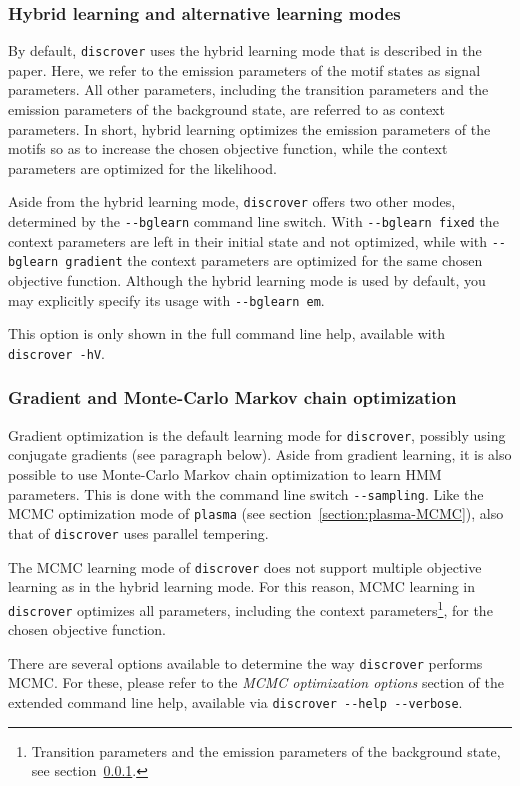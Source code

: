 \documentclass[a4paper]{article}
\newcommand{\plasma}[0]{\texttt{plasma}}
\newcommand{\discrover}[0]{\texttt{discrover}}
\begin{document}
\subsubsection{Hybrid learning and alternative learning modes}
\label{section:hybrid-learning}
By default, \discrover{} uses the hybrid learning mode that is described in the paper.
Here, we refer to the emission parameters of the motif states as signal parameters.
All other parameters, including the transition parameters and the emission parameters of the background state, are referred to as context parameters.
In short, hybrid learning optimizes the emission parameters of the motifs so as to increase the chosen objective function, while the context parameters are optimized for the likelihood.

Aside from the hybrid learning mode, \discrover{} offers two other modes, determined by the \verb|--bglearn| command line switch.
With \verb|--bglearn fixed| the context parameters are left in their initial state and not optimized, while with \verb|--bglearn gradient| the context parameters are optimized for the same chosen objective function.
Although the hybrid learning mode is used by default, you may explicitly specify its usage with \verb|--bglearn em|.

This option is only shown in the full command line help, available with \verb|discrover -hV|.

\subsubsection{Gradient and Monte-Carlo Markov chain optimization}
Gradient optimization is the default learning mode for \discrover{}, possibly using conjugate gradients (see paragraph below).
Aside from gradient learning, it is also possible to use Monte-Carlo Markov chain optimization to learn HMM parameters.
This is done with the command line switch \verb|--sampling|.
Like the MCMC optimization mode of \plasma{} (see section~\ref{section:plasma-MCMC}), also that of \discrover{} uses parallel tempering.

The MCMC learning mode of \discrover{} does not support multiple objective learning as in the hybrid learning mode.
For this reason, MCMC learning in \discrover{} optimizes all parameters, including the context parameters\footnote{Transition parameters and the emission parameters of the background state, see section~\ref{section:hybrid-learning}.}, for the chosen objective function.

There are several options available to determine the way \discrover{} performs MCMC\@.
For these, please refer to the \emph{MCMC optimization options} section of the extended command line help, available via \verb|discrover --help --verbose|.
\end{document}
